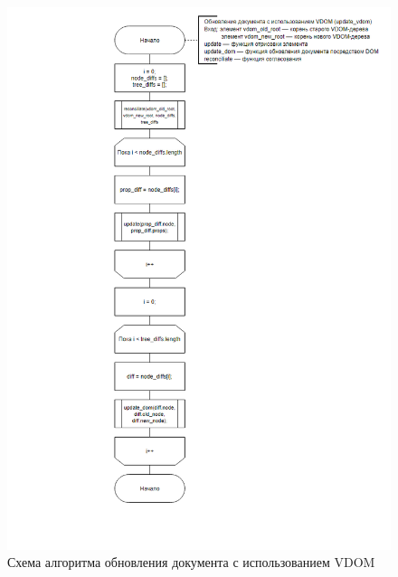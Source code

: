 \begin{figure}[h]
	\centering
	\includegraphics[width=160mm]{img/vdom-algorithm.png}
	\caption{Схема алгоритма обновления документа с использованием VDOM}
	\label{fig:vdom-algorithm}
\end{figure}

